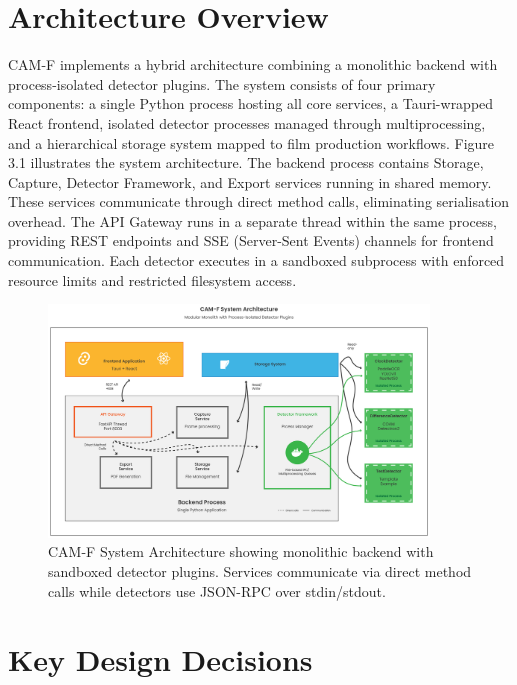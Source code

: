 \section{Architecture Overview}
CAM-F implements a hybrid architecture combining a monolithic backend with process-isolated detector plugins. The system consists of four primary components: a single Python process hosting all core services, a Tauri-wrapped React frontend, isolated detector processes managed through multiprocessing, and a hierarchical storage system mapped to film production workflows.
Figure 3.1 illustrates the system architecture. The backend process contains Storage, Capture, Detector Framework, and Export services running in shared memory. These services communicate through direct method calls, eliminating serialisation overhead. The API Gateway runs in a separate thread within the same process, providing REST endpoints and SSE (Server-Sent Events) channels for frontend communication. Each detector executes in a sandboxed subprocess with enforced resource limits and restricted filesystem access.

\begin{figure}[h]
\centering
\includegraphics[width=0.9\textwidth]{figures/Architecture.png}
\caption{CAM-F System Architecture showing monolithic backend with sandboxed detector plugins. Services communicate via direct method calls while detectors use JSON-RPC over stdin/stdout.}
\label{fig:architecture}
\end{figure}
\section{Key Design Decisions}
